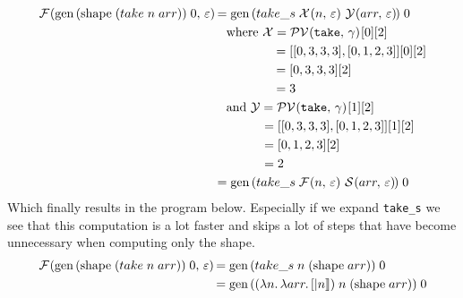 \documentclass[../main.tex]{subfiles}
\begin{document}
\begin{align*}
\mathcal{F}\hspace{-1.2pt} \left( \text{gen}\, (\text{shape}\; (take\; n\; arr))\; 0,\, \varepsilon \right) \hspace{-1pt}
    &= \text{gen}\, (take\_s\; \mathcal{X}\hspace{-1.2pt} \left( n,\, \varepsilon \right) \hspace{-1pt}\; \mathcal{Y}\hspace{-1.2pt} \left( arr,\, \varepsilon \right) \hspace{-1pt})\; 0 \\
        &\quad\text{where } \mathcal{X} = \mathcal{PV}\hspace{-1.2pt} \left( \texttt{take},\, \gamma \right) \hspace{-1pt}[0][2] \\
        &\hspace{47pt} = [[0,3,3,3], [0,1,2,3]][0][2] \\
        &\hspace{47pt} = [0,3,3,3][2] \\
        &\hspace{47pt} = 3 \\
        &\quad\text{and } \mathcal{Y} = \mathcal{PV}\hspace{-1.2pt} \left( \texttt{take},\, \gamma \right) \hspace{-1pt}[1][2] \\
        &\hspace{37.5pt} = [[0,3,3,3], [0,1,2,3]][1][2] \\
        &\hspace{37.5pt} = [0,1,2,3][2] \\
        &\hspace{37.5pt} = 2 \\
    &= \text{gen}\, (take\_s\; \mathcal{F}\hspace{-1.2pt} \left( n,\, \varepsilon \right) \hspace{-1pt}\; \mathcal{S}\hspace{-1.2pt} \left( arr,\, \varepsilon \right) \hspace{-1pt})\; 0
\end{align*}
%
Which finally results in the program below. Especially if we expand \texttt{take\_s} we see that this computation is a lot faster and skips a lot of steps that have become unnecessary when computing only the shape.
\begin{align*}
\mathcal{F}\hspace{-1.2pt} \left( \text{gen}\, (\text{shape}\; (take\; n\; arr))\; 0,\, \varepsilon \right) \hspace{-1pt}
    &= \text{gen}\, (take\_s\; n\; (\text{shape}\; arr))\; 0 \\
    &= \text{gen}\, ((\lambda n.\, \lambda arr.\, [|n|])\; n\; (\text{shape}\; arr))\; 0 \\
\end{align*}
\end{document}
